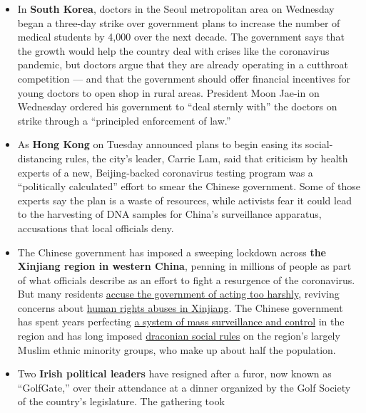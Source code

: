 \begin{itemize}
\item
  In \textbf{South Korea}, doctors in the Seoul metropolitan area on
  Wednesday began a three-day strike over government plans to increase
  the number of medical students by 4,000 over the next decade. The
  government says that the growth would help the country deal with
  crises like the coronavirus pandemic, but doctors argue that they are
  already operating in a cutthroat competition --- and that the
  government should offer financial incentives for young doctors to open
  shop in rural areas. President Moon Jae-in on Wednesday ordered his
  government to ``deal sternly with'' the doctors on strike through a
  ``principled enforcement of law.''
\item
  As \textbf{Hong Kong} on Tuesday announced plans to begin easing its
  social-distancing rules, the city's leader, Carrie Lam, said that
  criticism by health experts of a new, Beijing-backed coronavirus
  testing program was a ``politically calculated'' effort to smear the
  Chinese government. Some of those experts say the plan is a waste of
  resources, while activists fear it could lead to the harvesting of DNA
  samples for China's surveillance apparatus, accusations that local
  officials deny.
\item
  The Chinese government has imposed a sweeping lockdown across
  \textbf{the Xinjiang region in western China}, penning in millions of
  people as part of what officials describe as an effort to fight a
  resurgence of the coronavirus. But many residents
  \href{https://www.nytimes3xbfgragh.onion/2020/08/25/world/asia/china-xinjiang-covid.html}{accuse
  the government of acting too harshly}, reviving concerns about
  \href{https://www.nytimes3xbfgragh.onion/interactive/2019/11/16/world/asia/china-xinjiang-documents.html}{human
  rights abuses in Xinjiang}. The Chinese government has spent years
  perfecting
  \href{https://www.nytimes3xbfgragh.onion/2019/05/22/world/asia/china-surveillance-xinjiang.html}{a
  system of mass surveillance and control} in the region and has long
  imposed
  \href{https://www.nytimes3xbfgragh.onion/2019/12/28/world/asia/china-xinjiang-children-boarding-schools.html}{draconian
  social rules} on the region's largely Muslim ethnic minority groups,
  who make up about half the population.
\item
  Two \textbf{Irish political leaders} have resigned after a furor, now
  known as ``GolfGate,'' over their attendance at a dinner organized by
  the Golf Society of the country's legislature. The gathering took

\end{itemize}
